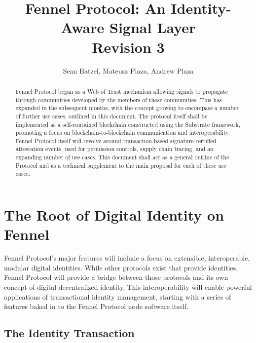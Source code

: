 \documentclass[]{article}
\title{Fennel Protocol: An Identity-Aware Signal Layer\\\large{Revision 3}}
\author{Sean Batzel, Mateusz Plaza, Andrew Plaza}
\begin{document}
\maketitle
\begin{abstract}
Fennel Protocol began as a Web of Trust mechanism allowing signals to propagate through communities developed by the members of those communities. This has expanded in the subsequent months, with the concept growing to encompass a number of further use cases, outlined in this document. The protocol itself shall be implemented as a self-contained blockchain constructed using the Substrate framework, promoting a focus on blockchain-to-blockchain communication and interoperability. Fennel Protocol itself will revolve around transaction-based signature-certified attestation events, used for permission controls, supply chain tracing, and an expanding number of use cases. This document shall act as a general outline of the Protocol and as a technical supplement to the main proposal for each of these use cases.
\end{abstract}
\clearpage

\tableofcontents

\listoffigures
\listoftables
\clearpage

\section{The Root of Digital Identity on Fennel}
\label{scrivauto:10}

Fennel Protocol's major features will include a focus on extensible, interoperable, modular digital identities. While other protocols exist that provide identities, Fennel Protocol will provide a bridge between those protocols and its own concept of digital decentralized identity. This interoperability will enable powerful applications of transactional identity management, starting with a series of features baked in to the Fennel Protocol node software itself.

\subsection{The Identity Transaction}
\label{scrivauto:11}
\end{document}
